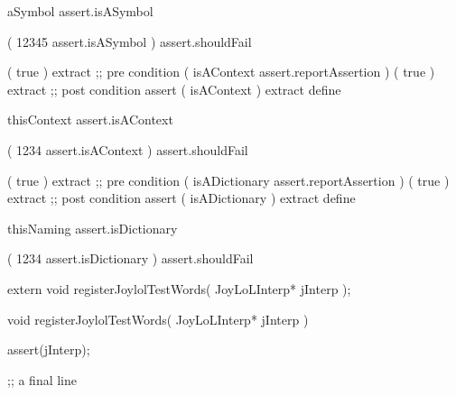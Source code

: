 \startJoylolTest
aSymbol
assert.isASymbol
\stopJoylolTest
\stopTestCase

\startJoylolTest
(
  12345
  assert.isASymbol
) assert.shouldFail
\stopJoylolTest
\stopTestCase
\stopTestSuite


\startJoylolCode
( { true } ) extract ;; pre condition
(
  isAContext
  assert.reportAssertion
)
( { true } ) extract ;; post condition
assert
( isAContext ) extract
define
\stopJoylolCode

\startJoylolTest
thisContext
assert.isAContext
\stopJoylolTest
\stopTestCase

\startJoylolTest
(
  1234
  assert.isAContext
) assert.shouldFail
\stopJoylolTest
\stopTestCase
\stopTestSuite


\startJoylolCode
( { true } ) extract ;; pre condition
(
  isADictionary
  assert.reportAssertion
)
( { true } ) extract ;; post condition
assert
( isADictionary ) extract
define
\stopJoylolCode

\startJoylolTest
thisNaming
assert.isDictionary
\stopJoylolTest
\stopTestCase

\startJoylolTest
(
  1234
  assert.isDictionary
) assert.shouldFail
\stopJoylolTest
\stopTestCase
\stopTestSuite

\starttyping
{}

\startJoylolCode
\stopJoylolCode

\startJoylolTest
\stopJoylolTest
\stopTestCase

\startJoylolTest
\stopJoylolTest
\stopTestCase
\stopTestSuite
\stoptyping

\startCHeader
extern void registerJoylolTestWords(
  JoyLoLInterp* jInterp
);
\stopCHeader
{}

\startCCode
void registerJoylolTestWords(
  JoyLoLInterp* jInterp
) {
  assert(jInterp);

}
\stopCCode

\startJoylolCode
;; a final line
\stopJoylolCode
